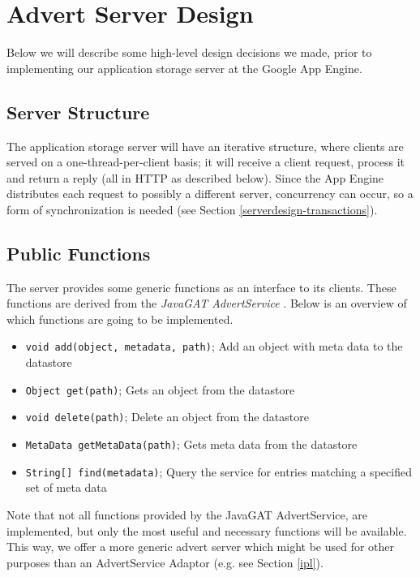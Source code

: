 \section{Advert Server Design}
\label{serverdesign}
Below we will describe some high-level design decisions we made, prior to
implementing our application storage server at the Google App Engine.

\subsection{Server Structure}
\label{serverdesign-structure}
The application storage server will have an iterative structure, where clients
are served on a one-thread-per-client basis; it will receive a client request,
process it and return a reply (all in HTTP as described below). Since the App
Engine distributes each request to possibly a different server, concurrency can
occur, so a form of synchronization is needed (see Section
\ref{serverdesign-transactions}).

\subsection{Public Functions}
\label{serverdesign-pub}
The server provides some generic functions as an interface to its clients. These
functions are derived from the \emph{JavaGAT AdvertService} \cite{javagat-www}. 
Below is an overview of which functions are going to be implemented.

\begin{itemize}
	\item \texttt{void add(object, metadata, path)}; Add an object with meta data to
		the datastore
	\item \texttt{Object get(path)}; Gets an object from the datastore
	\item \texttt{void delete(path)}; Delete an object from the datastore
	\item \texttt{MetaData getMetaData(path)}; Gets meta data from the datastore
	\item \texttt{String[] find(metadata)}; Query the service for entries matching
		a specified set of meta data 
\end{itemize}

Note that not all functions provided by the JavaGAT AdvertService, are
implemented, but only the most useful and necessary functions will be
available. This way, we offer a more generic advert server which might be
used for other purposes than an AdvertService Adaptor (e.g. see Section
\ref{ipl}).

